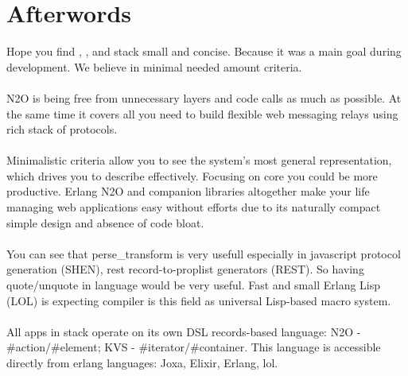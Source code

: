 
\begingroup
\section{Afterwords}

Hope you find ,
, and
 stack small and concise.
Because it was a main goal during development.
We believe in minimal needed amount criteria.

\paragraph{}
N2O is being free from unnecessary layers and code calls as much as possible.
At the same time it covers all you need to build
flexible web messaging relays using rich stack of protocols.

\paragraph{}
Minimalistic criteria allow you to see the system's
most general representation, which drives you to describe effectively.
Focusing on core you could be more productive.
Erlang N2O and companion libraries altogether make
your life managing web applications easy without
efforts due to its naturally compact simple design and absence of code bloat.

\paragraph{}
You can see that perse\_transform is very usefull especially in javascript
protocol generation (SHEN), rest record-to-proplist generators (REST). So having
quote/unquote in language would be very useful. Fast and small
Erlang Lisp (LOL) is expecting compiler is this field as universal
Lisp-based macro system.

\paragraph{}
All apps in stack operate on its own DSL
records-based language: N2O - \#action/\#element; KVS - \#iterator/\#container.
This language is accessible directly from erlang languages: Joxa, Elixir, Erlang, lol.

\endgroup

